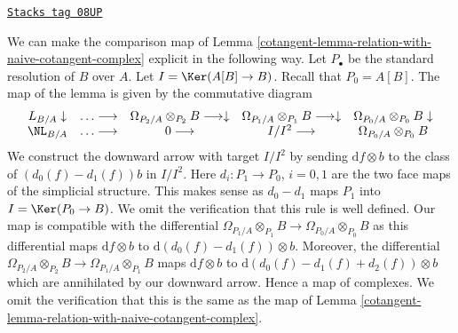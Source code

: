 \begin{remark}
\label{cotangent-remark-explicit-comparison-map}
\href{https://stacks.math.columbia.edu/tag/08UP}{\texttt{Stacks tag 08UP}}

We can make the comparison map of
Lemma \ref{cotangent-lemma-relation-with-naive-cotangent-complex}
explicit in the following way.
Let $P_\bullet$ be the standard resolution of $B$
over $A$.
Let $I = \Ker(A[B] \to B)$.
Recall that $P_0 = A[B]$. The map of the
lemma is given by the commutative diagram
$$
\begin{array}{ccccc}L_{B/A} \downarrow & \ldots \longrightarrow & \Omega_{P_2/A} \otimes_{P_2} B
\longrightarrow\downarrow & \Omega_{P_1/A} \otimes_{P_1} B
\longrightarrow\downarrow & \Omega_{P_0/A} \otimes_{P_0} B
\downarrow \\ \NL_{B/A} & \ldots \longrightarrow & 0 \longrightarrow & I/I^2 \longrightarrow & \Omega_{P_0/A} \otimes_{P_0} B\end{array}
$$
We construct the downward arrow with target $I/I^2$
by sending $\text{d}f \otimes b$ to the class of
$(d_0(f) - d_1(f))b$ in $I/I^2$. Here $d_i : P_1 \to P_0$,
$i = 0, 1$ are the two face maps of the simplicial structure.
This makes sense as $d_0 - d_1$ maps $P_1$ into $I = \Ker(P_0 \to B)$.
We omit the verification that this rule is well defined.
Our map is compatible with the differential
$\Omega_{P_1/A} \otimes_{P_1} B \to \Omega_{P_0/A} \otimes_{P_0} B$
as this differential maps $\text{d}f \otimes b$ to
$\text{d}(d_0(f) - d_1(f)) \otimes b$. Moreover, the differential
$\Omega_{P_2/A} \otimes_{P_2} B \to \Omega_{P_1/A} \otimes_{P_1} B$
maps $\text{d}f \otimes b$ to $\text{d}(d_0(f) - d_1(f) + d_2(f)) \otimes b$
which are annihilated by our downward arrow. Hence a map of complexes.
We omit the verification that this is the same as the map of
Lemma \ref{cotangent-lemma-relation-with-naive-cotangent-complex}.
\end{remark}


